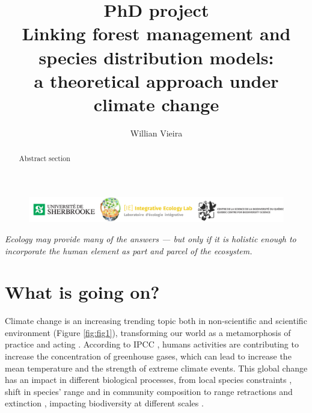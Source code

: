 


\title{
  PhD project \\
  Linking forest management and species distribution models: \\
  a theoretical approach under climate change
}

\author[1,*]{Willian Vieira}
\date{}



\maketitle

\begin{abstract}

Abstract section

\end{abstract}

\thispagestyle{empty} %

\vfill
\begin{figure}
\centering\includegraphics[width=16cm]{img/logo.pdf}
\end{figure}

\clearpage

\thispagestyle{empty} %

\tableofcontents

\clearpage

\begin{displayquote}
\centering\textit{Ecology may provide many of the answers — but only if it is holistic enough to incorporate the human element as part and parcel of the ecosystem.} \\ 
\end{displayquote}

\section{What is going on?}

Climate change is an increasing trending topic both in non-scientific \citep{Capstick2015} and scientific environment (Figure \ref{fig:fig1}), transforming our world as a metamorphosis of practice and acting \citep{Beck2016}.
According to IPCC \citep{Cubasch2013}, humans activities are contributing to increase the concentration of greenhouse gases, which can lead to increase the mean temperature and the strength of extreme climate events.
This global change has an impact in different biological processes, from local species constraints \citep[e.g. low regeneration][]{Treyger2011}, shift in species' range \citep{Boisvert-Marsh2014,Monleon2015} and in community composition \citep{Dieleman2015} to range retractions and extinction \citep{Thomas2006}, impacting biodiversity at different scales \citep{Penuelas2013}.


